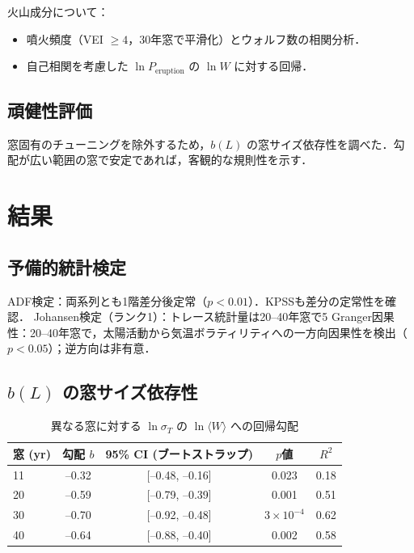 \documentclass[11pt,a4paper]{article}
\begin{document}
	火山成分について：
	\begin{itemize}
		\item 噴火頻度（VEI $\ge 4$，30年窓で平滑化）とウォルフ数の相関分析．
		\item 自己相関を考慮した $\ln P_{\text{eruption}}$ の $\ln W$ に対する回帰．
	\end{itemize}
	
	\subsection{頑健性評価}
	
	窓固有のチューニングを除外するため，$b(L)$ の窓サイズ依存性を調べた．勾配が広い範囲の窓で安定であれば，客観的な規則性を示す．
	
	\section{結果}
	
	\subsection{予備的統計検定}
	
	ADF検定：両系列とも1階差分後定常（$p < 0.01$）．KPSSも差分の定常性を確認．  
	Johansen検定（ランク1）：トレース統計量は20–40年窓で5%
	Granger因果性：20–40年窓で，太陽活動から気温ボラティリティへの一方向因果性を検出（$p < 0.05$）；逆方向は非有意．
	
	\subsection{$b(L)$ の窓サイズ依存性}
	
	\begin{table}[htbp]
		\centering
		\caption{異なる窓に対する $\ln \sigma_T$ の $\ln \langle W \rangle$ への回帰勾配}
		\label{tab:slopes}
		\begin{tabular}{@{}lcccc@{}}
			\toprule
			窓 (yr) & 勾配 $b$ & 95\% CI (ブートストラップ) & $p$値 & $R^2$ \\
			\midrule
			11 & –0.32 & [–0.48, –0.16] & 0.023 & 0.18 \\
			20 & –0.59 & [–0.79, –0.39] & 0.001 & 0.51 \\
			30 & –0.70 & [–0.92, –0.48] & $3\times10^{-4}$ & 0.62 \\
			40 & –0.64 & [–0.88, –0.40] & 0.002 & 0.58 \\
			\bottomrule
		\end{tabular}
	\end{table}
	
\end{document}

